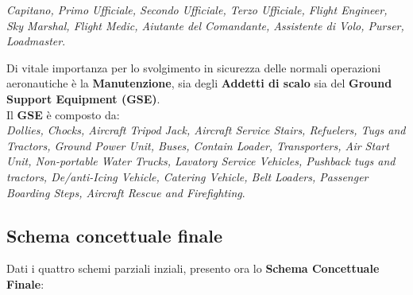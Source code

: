 \textsf{\small \emph{Capitano, Primo Ufficiale, Secondo Ufficiale, Terzo Ufficiale, Flight Engineer, Sky Marshal, Flight Medic, Aiutante del Comandante, Assistente di Volo, Purser, Loadmaster}.} \break

\textsf{\small Di vitale importanza per lo svolgimento in sicurezza delle normali operazioni aeronautiche è la \textbf{Manutenzione}, sia degli \textbf{Addetti di scalo} sia del \textbf{Ground Support Equipment (GSE)}.}\\

\textsf{\small Il \textbf{GSE} è composto da: }\\

\textsf{\small \emph{ Dollies, Chocks, Aircraft Tripod Jack, Aircraft Service Stairs, Refuelers, Tugs and Tractors, Ground Power Unit, Buses, Contain Loader, Transporters, Air Start Unit, Non-portable Water Trucks, Lavatory Service Vehicles, Pushback tugs and tractors, De/anti-Icing Vehicle, Catering Vehicle, Belt Loaders, Passenger Boarding Steps, Aircraft Rescue and Firefighting}.}\\



\subsection{Schema concettuale finale}

\textsf{\small Dati i quattro schemi parziali inziali, presento ora lo \textbf{Schema Concettuale Finale}:}\\




